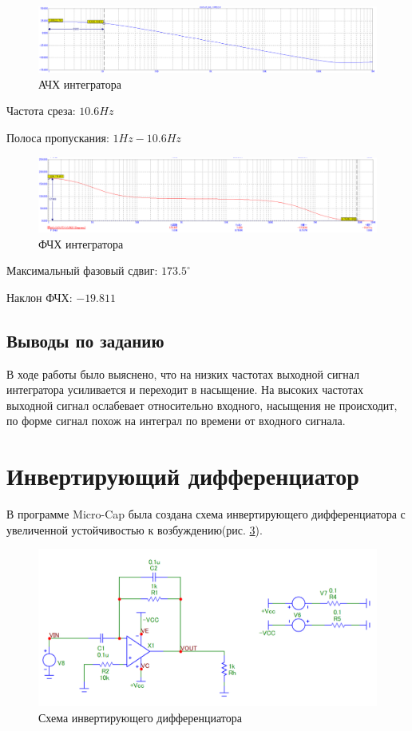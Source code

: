 \documentclass[a4paper,14pt]{article}
\begin{document}
\begin{figure}[H]
	\centering
	\includegraphics[width=\linewidth]{../imgs/int_fr}
	\caption{АЧХ интегратора}
	\label{fig:int_fr}
\end{figure}


Частота среза: $10.6Hz$

Полоса пропускания: $1Hz - 10.6Hz$

\begin{figure}[H]
	\centering
	\includegraphics[width=\linewidth]{../imgs/int_pr}
	\caption{ФЧХ интегратора}
	\label{fig:int_pr}
\end{figure}

Максимальный фазовый сдвиг: $173.5^{\circ}$

Наклон ФЧХ: $-19.811$

\subsection{Выводы по заданию}

В ходе работы было выяснено, что на низких частотах выходной сигнал интегратора усиливается и переходит в насыщение.
На высоких частотах выходной сигнал ослабевает относительно входного, насыщения не происходит, по форме сигнал похож на интеграл по времени от входного сигнала.

\section{Инвертирующий дифференциатор}

В программе Micro-Cap была создана схема инвертирующего дифференциатора с увеличенной устойчивостью к возбуждению(рис. \ref{fig:schema_diff}).

\begin{figure}[H]
	\centering
	\includegraphics[width=\linewidth]{../imgs/schema_diff}
	\caption{Схема инвертирующего дифференциатора}
	\label{fig:schema_diff}
\end{figure}
\end{document}
